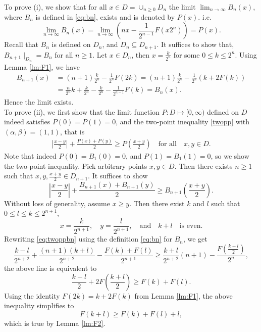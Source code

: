 \documentclass[11pt]{amsart}
\theoremstyle{definition}
\renewcommand{\1}{{\mathbbm{1}}}
\begin{document}
To prove (i), we show that for all $x \in D= \cup_{n \geq 0} D_{n}$ the limit  $\lim_{n \to \infty}B_{n}(x)$, where $B_n$ is defined in \eqref{eq:bn}, exists and is denoted by $P(x)$. 
i.e.
\[
\lim_{n\to\infty} B_n(x) 
= \lim_{n\to\infty} 
\left(   nx - \frac{1}{2^{n-1}} F(x2^n)
   \right) = P(x).
\]
Recall that $B_n$ is defined on ${D}_n$, and $D_n\subseteq D_{n+1}$. It suffices to show that, $B_{n+1}\mid_{D_n}= B_n$  for all $n\geq 1$.
Let $x\in D_n$, then $x=\frac{k}{2^n}$ for some $0\leq k \leq 2^n$.
Using Lemma \ref{lm:F1}, we have
\begin{align*}
    B_{n+1}(x) 
    &=  (n+1)\frac{k}{2^n} - \frac{1}{2^n}F\left( 2k \right)= (n+1)\frac{k}{2^n} - \frac{1}{2^n}\left( k + 2F(k) \right)\\
    & = \frac{n}{2^n}k + \frac{k}{2^n}-\frac{k}{2^n} - \frac{1}{2^{n-1}} F(k)= B_n(x).
\end{align*}
Hence the limit exists.\\%



To prove (ii), we first show that the limit function $P: D \mapsto [0,\infty)$ defined on $D$ indeed satisfies $P(0)=P(1)=0$, and the two-point inequality \eqref{twopp} with $(\alpha, \beta)=(1,1)$, that is 
\begin{align}\label{ori}
\left| \frac{x-y}{2}\right| + \frac{P(x)+P(y)}{2} \geq P\left( \frac{x+y}{2} \right) \quad \text{for all} \quad x,y \in D. 
\end{align}
Note that indeed $P(0)=B_{1}(0)=0$, and $P(1)=B_{1}(1)=0$, so we show the two-point inequality.
Pick arbitrary points $x,y \in D$. Then there exists $n\geq 1$ such that $x,y,\frac{x+y}{2}\in D_{n+1}$.
It suffices to show
\begin{equation}
\label{eq:twoppbn}
    \left| \frac{x-y}{2}\right| + \frac{B_{n+1}(x)+B_{n+1}(y)}{2} \geq B_{n+1}\left( \frac{x+y}{2} \right).
\end{equation}
Without loss of generality, assume $x\geq y$. Then there exist $k$ and $l$ such that $0\leq l \leq k \leq 2^{n+1}$,
\[
x=\frac{k}{2^{n+1}},\quad y=\frac{l}{2^{n+1}}, \quad \text{and} \quad k+l \quad \text{is even}.
\]
Rewriting \eqref{eq:twoppbn} using the definition \eqref{eq:bn} for $B_n$, we get
\[
\frac{k-l}{2^{n+2}}+\frac{(n+1)(k+l)}{2^{n+2}} - \frac{F(k)+F(l)}{2^{n+1}}\geq \frac{k+l}{2^{n+2}}(n+1) - \frac{F\left(\frac{k+l}{2}\right)}{2^n},
\]
the above line is 
equivalent to
\[
\frac{k-l}{2} +2F\left(\frac{k+l}{2}\right) \geq F(k)+F(l).
\]
Using the identity
$F(2k) = k + 2 F(k)$ from Lemma \eqref{lm:F1}, the above inequality simplifies to 
\[
F(k+l) \geq F(k)+F(l)+l,
\]
which is true by Lemma \ref{lm:F2}.
\end{document}
